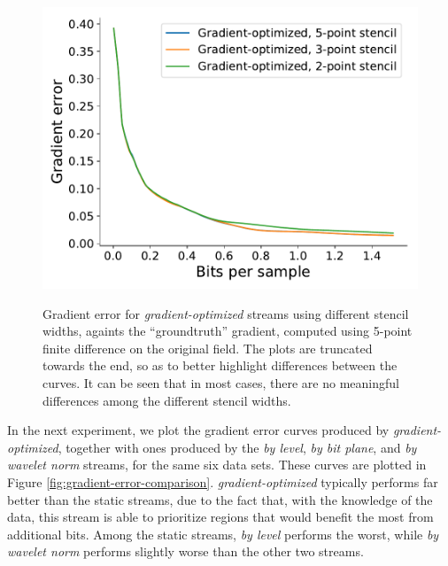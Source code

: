 \begin{figure}[t]
	{\includegraphics[width=0.48\linewidth]{img/gradient/compare-stencils/gradient-optimized-velocityz.pdf}}
	\caption{Gradient error for \emph{gradient-optimized} streams using different stencil widths,
	againts the ``groundtruth'' gradient, computed using 5-point finite difference on the original
	field. The plots are truncated towards the end, so as to better highlight differences between the
	curves. It can be seen that in most cases, there are no meaningful differences among the different
	stencil widths.}
	\label{fig:gradient-stencil-comparison}
\end{figure}

In the next experiment, we plot the gradient error curves produced by \emph{gradient-optimized},
together with ones produced by the \emph{by level}, \emph{by bit plane}, and \emph{by wavelet norm}
streams, for the same six data sets. These curves are plotted in Figure
\ref{fig:gradient-error-comparison}. \emph{gradient-optimized} typically performs far better than
the static streams, due to the fact that, with the knowledge of the data, this stream is able to
prioritize regions that would benefit the most from additional bits. Among the static streams,
\emph{by level} performs the worst, while \emph{by wavelet norm} performs slightly worse than the
other two streams. 

